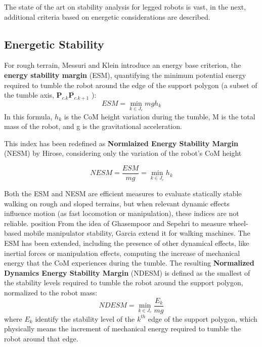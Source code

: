 The state of the art on stability analysis for legged robots is vast, in the next, additional criteria based on energetic considerations are described. 

\subsection{Energetic Stability}
\label{sec:gripping_stability}

For rough terrain, Messuri and Klein introduce an energy base criterion, the \textbf{energy stability margin} (ESM)\cite{ESM}, quantifying the minimum potential energy required to tumble the robot around the edge of the support polygon (a subset of the tumble axis, $\overline{\mathbf{P}_{c.k}\mathbf{P}_{c.k+1}}$ ):
\begin{equation}
\label{eq:ESM}
    ESM =\min_{k\in J_c}{mgh_k}
\end{equation}
In this formula, $h_k$ is the CoM height variation during the tumble, M is the total mass of the robot, and g is the gravitational acceleration. 

This index has been redefined  as \textbf{Normlaized Energy Stability Margin} (NESM) by Hirose, considering only the variation of the robot's CoM height \cite{NormalizedEnergySM}

\begin{equation}
\label{eq:NESM}
    NESM = \frac{ESM}{mg} = \min_{k \in J_c}{h_k}
\end{equation}

Both the ESM and NESM are efficient measures to evaluate statically stable walking on rough and sloped terrains\cite{EnergyIndexhexapod}, but when relevant dynamic effects influence motion (as fast locomotion or manipulation), these indices are not reliable. 
position
From the idea of Ghasempoor and Sepehri\cite{DESMidea} to measure wheel-based mobile manipulator stability, Garcia \cite{GarciaDESM} extend it for walking machines. 
The ESM has been extended, including the presence of other dynamical effects, like inertial forces or manipulation effects, computing the increase of mechanical energy that the CoM experiences during the tumble. 
The resulting \textbf{Normalized Dynamics Energy Stability Margin} (NDESM) is defined as the smallest of the stability levels required to tumble the robot around the support
polygon, normalized to the robot mass: 
\begin{equation}
\label{eq:NDESM}
    NDESM = \min_{k \in J_c}{\frac{E_k}{mg}}
\end{equation}
where $E_k$ identify the stability level of the $k^{th}$ edge of the support polygon,
which physically means the increment of mechanical energy required to tumble
the robot around that edge. 

